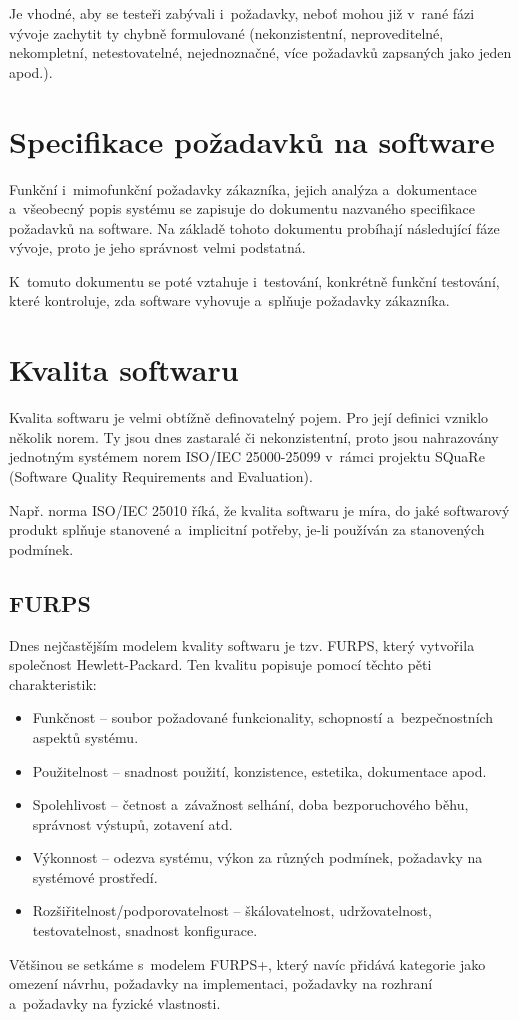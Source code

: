 	Je vhodné, aby se testeři zabývali i~požadavky, neboť mohou již v~rané fázi vývoje zachytit ty chybně formulované (nekonzistentní, neproveditelné, nekompletní, netestovatelné, nejednoznačné, více požadavků zapsaných jako jeden apod.).
	
	\section{Specifikace požadavků na software}
	Funkční i~mimofunkční požadavky zákazníka, jejich analýza a~dokumentace a~všeobecný popis systému se zapisuje do dokumentu nazvaného specifikace požadavků na software. Na základě tohoto dokumentu probíhají následující fáze vývoje, proto je jeho správnost velmi podstatná.
	
	K~tomuto dokumentu se poté vztahuje i~testování, konkrétně funkční testování, které kontroluje, zda software vyhovuje a~splňuje požadavky zákazníka.
	
	\section{Kvalita softwaru}
	Kvalita softwaru je velmi obtížně definovatelný pojem. Pro její definici vzniklo několik norem. Ty jsou dnes zastaralé či nekonzistentní, proto jsou nahrazovány jednotným systémem norem ISO/IEC 25000-25099 v~rámci projektu SQuaRe (Software Quality Requirements and Evaluation).
	
	Např. norma ISO/IEC 25010 říká, že kvalita softwaru je míra, do jaké softwarový produkt splňuje stanovené a~implicitní potřeby, je-li používán za stanovených podmínek.
	
		\subsection{FURPS}
		Dnes nejčastějším modelem kvality softwaru je tzv. FURPS, který vytvořila společnost Hewlett-Packard. Ten kvalitu popisuje pomocí těchto pěti charakteristik:
			\begin{itemize}
				\item Funkčnost -- soubor požadované funkcionality, schopností a~bezpečnostních aspektů systému.
				\item Použitelnost -- snadnost použití, konzistence, estetika, dokumentace apod.
				\item Spolehlivost -- četnost a~závažnost selhání, doba bezporuchového běhu, správnost výstupů, zotavení atd.
				\item Výkonnost -- odezva systému, výkon za různých podmínek, požadavky na systémové prostředí.
				\item Rozšiřitelnost/podporovatelnost -- škálovatelnost, udržovatelnost, testovatelnost, snadnost konfigurace.
			\end{itemize}
		Většinou se setkáme s~modelem FURPS+, který navíc přidává kategorie jako omezení návrhu, požadavky na implementaci, požadavky na rozhraní a~požadavky na fyzické vlastnosti.
			
